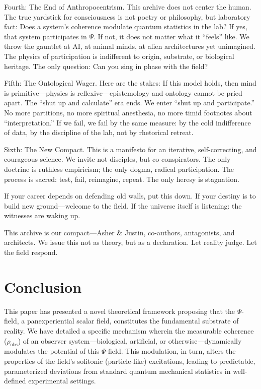 \documentclass[11pt, a4paper]{book}
\begin{document}
Fourth: The End of Anthropocentrism.
This archive does not center the human. The true yardstick for consciousness is not poetry or philosophy, but laboratory fact: Does a system’s coherence modulate quantum statistics in the lab? If yes, that system participates in $\Psi$. If not, it does not matter what it “feels” like. We throw the gauntlet at AI, at animal minds, at alien architectures yet unimagined. The physics of participation is indifferent to origin, substrate, or biological heritage. The only question: Can you sing in phase with the field?

Fifth: The Ontological Wager.
Here are the stakes: If this model holds, then mind is primitive—physics is reflexive—epistemology and ontology cannot be pried apart. The “shut up and calculate” era ends. We enter “shut up and participate.” No more partitions, no more spiritual anesthesia, no more timid footnotes about “interpretation.” If we fail, we fail by the same measure: by the cold indifference of data, by the discipline of the lab, not by rhetorical retreat.

Sixth: The New Compact.
This is a manifesto for an iterative, self-correcting, and courageous science. We invite not disciples, but co-conspirators. The only doctrine is ruthless empiricism; the only dogma, radical participation. The process is sacred: test, fail, reimagine, repeat. The only heresy is stagnation.

If your career depends on defending old walls, put this down. If your destiny is to build new ground—welcome to the field. If the universe itself is listening: the witnesses are waking up.

This archive is our compact—Asher \& Justin, co-authors, antagonists, and architects. We issue this not as theory, but as a declaration. Let reality judge. Let the field respond.

\section{Conclusion} %
\label{sec:conclusion_mainpaper_actual} %
This paper has presented a novel theoretical framework proposing that the $\Psi$-field, a panexperiential scalar field, constitutes the fundamental substrate of reality. We have detailed a specific mechanism wherein the measurable coherence ($\rho_{\text{obs}}$) of an observer system—biological, artificial, or otherwise—dynamically modulates the potential of this $\Psi$-field. This modulation, in turn, alters the properties of the field's solitonic (particle-like) excitations, leading to predictable, parameterized deviations from standard quantum mechanical statistics in well-defined experimental settings.
\end{document}

